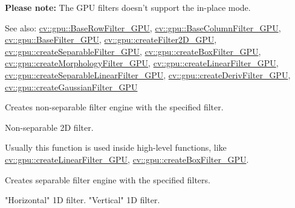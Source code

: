 \textbf{Please note:} The GPU filters doesn't support the in-place mode.

See also: \hyperref[class.gpu.BaseRowFilter]{cv::gpu::BaseRowFilter\_GPU}, \hyperref[class.gpu.BaseColumnFilter]{cv::gpu::BaseColumnFilter\_GPU}, \hyperref[class.gpu.BaseFilter]{cv::gpu::BaseFilter\_GPU}, \hyperref[cppfunc.gpu.createFilter2D]{cv::gpu::createFilter2D\_GPU}, \hyperref[cppfunc.gpu.createSeparableFilter]{cv::gpu::createSeparableFilter\_GPU}, \hyperref[cppfunc.gpu.createBoxFilter]{cv::gpu::createBoxFilter\_GPU}, \hyperref[cppfunc.gpu.createMorphologyFilter]{cv::gpu::createMorphologyFilter\_GPU}, \hyperref[cppfunc.gpu.createLinearFilter]{cv::gpu::createLinearFilter\_GPU}, \hyperref[cppfunc.gpu.createSeparableLinearFilter]{cv::gpu::createSeparableLinearFilter\_GPU}, \hyperref[cppfunc.gpu.createDerivFilter]{cv::gpu::createDerivFilter\_GPU}, \hyperref[cppfunc.gpu.createGaussianFilter]{cv::gpu::createGaussianFilter\_GPU}


\label{cppfunc.gpu.createFilter2D}
Creates non-separable filter engine with the specified filter.


\begin{description}
 {Non-separable 2D filter.}
\end{description}

Usually this function is used inside high-level functions, like \hyperref[cppfunc.gpu.createLinearFilter]{cv::gpu::createLinearFilter\_GPU}, \hyperref[cppfunc.gpu.createBoxFilter]{cv::gpu::createBoxFilter\_GPU}.


\label{cppfunc.gpu.createSeparableFilter}
Creates separable filter engine with the specified filters.


\begin{description}
 {"Horizontal" 1D filter.}
 {"Vertical" 1D filter.}
\end{description}


